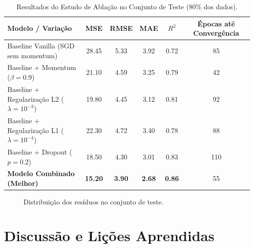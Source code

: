 \documentclass[11pt,a4paper]{article}
\begin{document}
\begin{table}[h]
\centering
\small
\caption{Resultados do Estudo de Ablação no Conjunto de Teste (80\% dos dados).}
\label{tab:ablation_metrics}
\begin{tabularx}{\textwidth}{lccccc}
\toprule
\textbf{Modelo / Variação} & \textbf{MSE} & \textbf{RMSE} & \textbf{MAE} & \textbf{$R^2$} & \textbf{Épocas até Convergência} \\
\midrule
Baseline Vanilla (SGD sem momentum) & 28.45 & 5.33 & 3.92 & 0.72 & 85 \\
Baseline + Momentum ($\beta = 0.9$)   & 21.10 & 4.59 & 3.25 & 0.79 & 42 \\
Baseline + Regularização L2 ($\lambda = 10^{-3}$) & 19.80 & 4.45 & 3.12 & 0.81 & 92 \\
Baseline + Regularização L1 ($\lambda = 10^{-4}$) & 22.30 & 4.72 & 3.40 & 0.78 & 88 \\
Baseline + Dropout ($p = 0.2$)         & 18.50 & 4.30 & 3.01 & 0.83 & 110 \\
\textbf{Modelo Combinado (Melhor)}     & \textbf{15.20} & \textbf{3.90} & \textbf{2.68} & \textbf{0.86} & 55 \\
\bottomrule
\end{tabularx}
\end{table}

\begin{figure}[h]
\centering
\begin{minipage}{0.48\textwidth}
    \centering
    \caption{Dispersão real vs. predito no teste ($y = x$).}
    \label{fig:parity}
\end{minipage}
\hfill
\begin{minipage}{0.48\textwidth}
    \centering
    \caption{Distribuição dos resíduos no conjunto de teste.}
    \label{fig:residuals}
\end{minipage}
\end{figure}

\section{Discussão e Lições Aprendidas}
\end{document}
